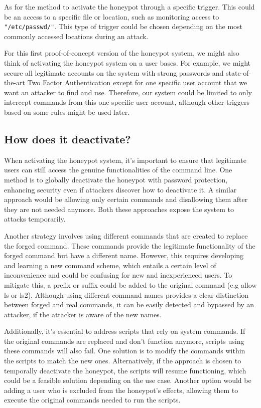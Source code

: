 As for the method to activate the honeypot through a specific trigger.
This could be an access to a specific file or location, such as monitoring access to \texttt{"/etc/passwd/"}.
This type of trigger could be chosen depending on the most commonly accessed locations during an attack.

For this first proof-of-concept version of the honeypot system, we might also think of activating the honeypot system on a user bases. For example, we might secure all legitimate accounts on the system with strong passwords and state-of-the-art Two Factor Authentication except for one specific user account that we want an attacker to find and use. Therefore, our system could be limited to only intercept commands from this one specific user account, although other triggers based on some rules might be used later.

\subsection{How does it deactivate?}

When activating the honeypot system, it's important to ensure that legitimate users can still access the genuine functionalities of the command line. One method is to globally deactivate the honeypot with password protection, enhancing security even if attackers discover how to deactivate it. A similar approach would be allowing only certain commands and disallowing them after they are not needed anymore. Both these approaches expose the system to attacks temporarily.  

Another strategy involves using different commands that are created to replace the forged command. These commands provide the legitimate functionality of the forged command but have a different name. However, this requires developing and learning a new command scheme, which entails a certain level of inconvenience and could be confusing for new and inexperienced users.    
To mitigate this, a prefix or suffix could be added to the original command (e.g allow ls or ls2). Although using different command names provides a clear distinction between forged and real commands, it can be easily detected and bypassed by an attacker, if the attacker is aware of the new names.

Additionally, it's essential to address scripts that rely on system commands. If the original commands are replaced and don't function anymore, scripts using these commands will also fail. One solution is to modify the commands within the scripts to match the new ones. Alternatively, if the approach is chosen to temporally deactivate the honeypot, the scripts will resume functioning, which could be a feasible solution depending on the use case. Another option would be adding a user who is excluded from the honeypot's effects, allowing them to execute the original commands needed to run the scripts.

